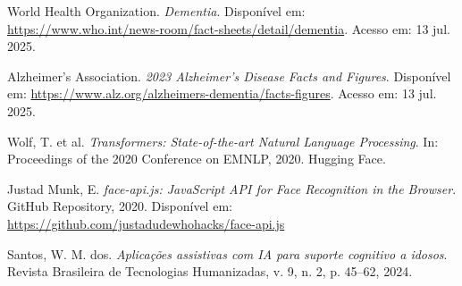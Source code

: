 \documentclass[12pt]{article}
\begin{document}
\begin{thebibliography}{9}

World Health Organization. 
\textit{Dementia}. 
Disponível em: \url{https://www.who.int/news-room/fact-sheets/detail/dementia}. Acesso em: 13 jul. 2025.

Alzheimer's Association.
\textit{2023 Alzheimer's Disease Facts and Figures}.
Disponível em: \url{https://www.alz.org/alzheimers-dementia/facts-figures}. Acesso em: 13 jul. 2025.

Wolf, T. et al.
\textit{Transformers: State-of-the-art Natural Language Processing}.
In: Proceedings of the 2020 Conference on EMNLP, 2020. Hugging Face.

Justad Munk, E.
\textit{face-api.js: JavaScript API for Face Recognition in the Browser}.
GitHub Repository, 2020. Disponível em: \url{https://github.com/justadudewhohacks/face-api.js}

Santos, W. M. dos.
\textit{Aplicações assistivas com IA para suporte cognitivo a idosos}. 
Revista Brasileira de Tecnologias Humanizadas, v. 9, n. 2, p. 45–62, 2024.

\end{thebibliography}
\end{document}
